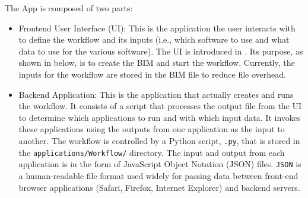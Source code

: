 The \texttt{\getsoftwarename{}} App is composed of two parts:
\begin{itemize}
    \item Frontend User Interface (UI): This is the application the user interacts with to define the workflow and its inputs (i.e., which software to use and what data to use for the various software). The UI is introduced in . Its purpose, as shown in  below, is to create the BIM and start the workflow. Currently, the inputs for the workflow are stored in the BIM file to reduce file overhead.
    \item Backend Application: This is the application that actually creates and runs the workflow. It consists of a script that processes the output file from the UI to determine which applications to run and with which input data. It invokes these applications using the outputs from one application as the input to another. The workflow is controlled by a Python script, \texttt{\getsoftwarename{}.py}, that is stored in the \texttt{applications/Workflow/} directory. The input and output from each application is in the form of JavaScript Object Notation (JSON) files. \texttt{JSON} is a human-readable file format used widely for passing data between front-end browser applications (Safari, Firefox, Internet Explorer) and backend servers.
\end{itemize}


